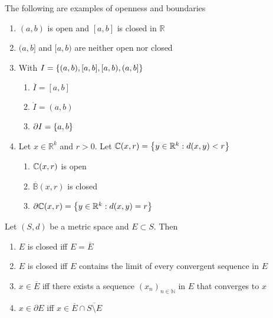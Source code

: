 \documentclass[../notes.tex]{subfiles}
\begin{document}
\begin{example}
    The following are examples of openness and boundaries
    \begin{enumerate}
        \item $(a,b)$ is open and $[a,b]$ is closed in $\mathbb{R}$
        \item $(a,b]$ and $[a,b)$ are neither open nor closed
        \item With $I = \qty{(a,b), [a,b], [a,b), (a,b]}$
        \begin{enumerate}
            \item $\overline{I} = [a,b]$
            \item $\mathring{I} = (a,b)$
            \item $\partial I = \qty{a,b}$
        \end{enumerate}
    \item Let $x \in \mathbb{R}^k$ and $r > 0$. Let $\mathbb{C}\qty(x,r) = \qty{y \in \mathbb{R}^k : d(x,y) < r}$
        \begin{enumerate}
            \item $\mathbb{C}\qty(x,r)$ is open
            \item $\overline{\mathbb{B}}(x,r)$ is closed
            \item $\partial \mathbb{C}\qty(x,r) = \qty{y \in \mathbb{R}^k : d(x,y) = r}$ 
        \end{enumerate}
    \end{enumerate}
\end{example}

\begin{theorem}
    Let $(S,d)$ be a metric space and $E \subset S$. Then
    \begin{enumerate}
        \item $E$ is closed iff $E = \overline{E}$
        \item $E$ is closed iff $E$ contains the limit of every convergent sequence in $E$
        \item $x \in \overline{E}$ iff there exists a sequence $(x_n)_{n\in \mathbb{N}}$ in $E$ that converges to $x$
        \item $x \in \partial E$ iff $x \in \overline{E} \cap \overline{S\setminus E}$
    \end{enumerate}
\end{theorem}
\end{document}
